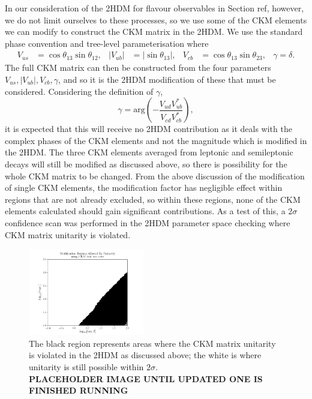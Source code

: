 \documentclass[11pt]{article}
\begin{document}
In our consideration of the 2HDM for flavour observables in Section ref, however, we do not limit ourselves to these processes, so we use some of the CKM elements we can modify to construct the CKM matrix in the 2HDM. 
We use the standard phase convention and tree-level parameterisation where 
\begin{align}
    V_{us} &= \cos\theta_{13}\sin\theta_{12}, & |V_{ub}| &= |\sin\theta_{13}|, & V_{cb} &= \cos\theta_{13}\sin\theta_{23}, & \gamma = \delta.
\end{align}
The full CKM matrix can then be constructed from the four parameters $V_{us},|V_{ub}|,V_{cb},\gamma$, and so it is the 2HDM modification of these that must be considered. 
Considering the definition of $\gamma$,
\begin{equation}
    \gamma = \text{arg}\left(-\frac{V_{ud}V_{ub}^*}{V_{cd}V_{cb}^*}\right),
\end{equation}
it is expected that this will receive no 2HDM contribution as it deals with the complex phases of the CKM elements and not the magnitude which is modified in the 2HDM.
The three CKM elements averaged from leptonic and semileptonic decays will still be modified as discussed above, so there is possibility for the whole CKM matrix to be changed. 
From the above discussion of the modification of single CKM elements, the modification factor has negligible effect within regions that are not already excluded, so within these regions, none of the CKM elements calculated should gain significant contributions. 
As a test of this, a $2\sigma$ confidence scan was performed in the 2HDM parameter space checking where CKM matrix unitarity is violated.
\begin{figure}[H]
    \centering
    \includegraphics[width=0.45\textwidth]{heatmaps/mod.png}
    \caption{The black region represents areas where the CKM matrix unitarity is violated in the 2HDM as discussed above; the white is where unitarity is still possible within $2\sigma$. \\ \textbf{PLACEHOLDER IMAGE UNTIL UPDATED ONE IS FINISHED RUNNING}}
\end{figure}
\end{document}
